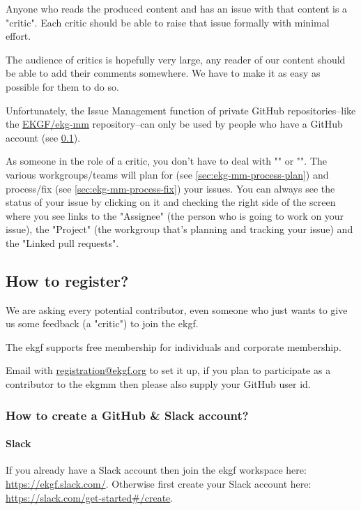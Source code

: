 Anyone who reads the produced content and has an issue with that content is a "critic".
Each critic should be able to raise that issue formally with minimal effort.

The audience of critics is hopefully very large, any reader of our content should
be able to add their comments somewhere.
We have to make it as easy as possible for them to do so. 

Unfortunately, the Issue Management function of private GitHub repositories--like
the \href{https://github.com/ekgf/ekg-mm}{EKGF/ekg-mm} repository--can only be
used by people who have a GitHub account (see \ref{subsec:ekg-mm-process-how-to-register}).

As someone in the role of a critic, you don’t have to deal with ""
or "". 
The various workgroups/teams will plan for (see \ref{sec:ekg-mm-process-plan})
and process/fix (see \ref{sec:ekg-mm-process-fix}) your issues. 
You can always see the status of your issue by clicking on it and checking 
the right side of the screen where you see links to the "Assignee"
(the person who is going to work on your issue), the "Project"
(the workgroup that’s planning and tracking your issue) and the "Linked pull requests". 

\subsection{How to register?}
\label{subsec:ekg-mm-process-how-to-register}

We are asking every potential contributor, even someone who just wants to give us
some feedback (a "critic") to join the \gls{ekgf}.

The \gls{ekgf} supports free membership for individuals and corporate membership.

Email with \href{mailto:registration@ekgf.org}{registration@ekgf.org} to set it up,
if you plan to participate as a contributor to the \gls{ekgmm} then please also
supply your GitHub user id.

\subsubsection{How to create a GitHub \& Slack account?}

\paragraph{Slack}

If you already have a Slack account then join the \gls{ekgf} workspace here:
\url{https://ekgf.slack.com/}. Otherwise first create your Slack account here:
\url{https://slack.com/get-started#/create}.

